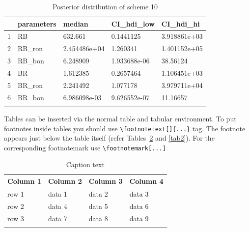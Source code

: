 \documentclass[pdflatex,sn-mathphys-num]{sn-jnl}%
\theoremstyle{thmstyleone}%
\theoremstyle{thmstyletwo}%
\theoremstyle{thmstylethree}%
\begin{document}
\begin{table}[h]
\caption{Posterior distribution of scheme 10}\label{tab1}%
\begin{tabular}{@{}lllll@{}}
\toprule
 & parameters & median & CI\_hdi\_low & CI\_hdi\_hi \\ 
\midrule
1 & RB & 632.661 & 0.1441125 & 3.918861e+03 \\ 
  2 & RB\_ron & 2.454486e+04 & 1.260341 & 1.401152e+05 \\ 
  3 & RB\_bon & 6.248909 & 1.933688e-06 & 38.56124 \\ 
  4 & BR & 1.612385 & 0.2657464 & 1.106451e+03 \\ 
  5 & BR\_ron & 2.241492 & 1.077178 & 3.979711e+04 \\ 
  6 & BR\_bon & 6.986098e-03 & 9.626552e-07 & 11.16657 \\ 
\botrule
\end{tabular}
\end{table}







Tables can be inserted via the normal table and tabular environment. To put
footnotes inside tables you should use \verb+\footnotetext[]{...}+ tag.
The footnote appears just below the table itself (refer Tables~\ref{tab1} and \ref{tab2}). 
For the corresponding footnotemark use \verb+\footnotemark[...]+

\begin{table}[h]
\caption{Caption text}\label{tab1}%
\begin{tabular}{@{}llll@{}}
\toprule
Column 1 & Column 2  & Column 3 & Column 4\\
\midrule
row 1    & data 1   & data 2  & data 3  \\
row 2    & data 4   & data 5\footnotemark[1]  & data 6  \\
row 3    & data 7   & data 8  & data 9\footnotemark[2]  \\
\botrule
\end{tabular}
\end{table}
\end{document}
